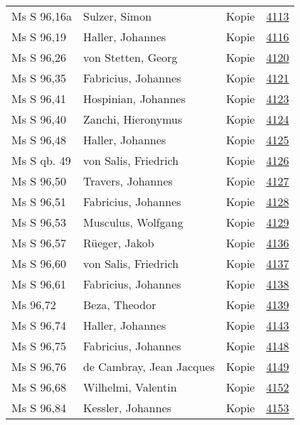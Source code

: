 \documentclass[10pt,a4paper,landscape]{report}
\begin{document}
\begin{longtable}{p{16cm}p{4cm}lr}
Ms S 96,16a	&	Sulzer, Simon	&	Kopie	&	\href{http://130.60.24.72/assignment/4113}{4113}\\
Ms S 96,19	&	Haller, Johannes	&	Kopie	&	\href{http://130.60.24.72/assignment/4116}{4116}\\
Ms S 96,26	&	von Stetten, Georg	&	Kopie	&	\href{http://130.60.24.72/assignment/4120}{4120}\\
Ms S 96,35	&	Fabricius, Johannes	&	Kopie	&	\href{http://130.60.24.72/assignment/4121}{4121}\\
Ms S 96,41	&	Hospinian, Johannes	&	Kopie	&	\href{http://130.60.24.72/assignment/4123}{4123}\\
Ms S 96,40	&	Zanchi, Hieronymus	&	Kopie	&	\href{http://130.60.24.72/assignment/4124}{4124}\\
Ms S 96,48	&	Haller, Johannes	&	Kopie	&	\href{http://130.60.24.72/assignment/4125}{4125}\\
Ms S qb. 49	&	von Salis, Friedrich	&	Kopie	&	\href{http://130.60.24.72/assignment/4126}{4126}\\
Ms S 96,50	&	Travers, Johannes	&	Kopie	&	\href{http://130.60.24.72/assignment/4127}{4127}\\
Ms S 96,51	&	Fabricius, Johannes	&	Kopie	&	\href{http://130.60.24.72/assignment/4128}{4128}\\
Ms S 96,53	&	Musculus, Wolfgang	&	Kopie	&	\href{http://130.60.24.72/assignment/4129}{4129}\\
Ms S 96,57	&	Rüeger, Jakob	&	Kopie	&	\href{http://130.60.24.72/assignment/4136}{4136}\\
Ms S 96,60	&	von Salis, Friedrich	&	Kopie	&	\href{http://130.60.24.72/assignment/4137}{4137}\\
Ms S 96,61	&	Fabricius, Johannes	&	Kopie	&	\href{http://130.60.24.72/assignment/4138}{4138}\\
Ms 96,72	&	Beza, Theodor	&	Kopie	&	\href{http://130.60.24.72/assignment/4139}{4139}\\
Ms S 96,74	&	Haller, Johannes	&	Kopie	&	\href{http://130.60.24.72/assignment/4143}{4143}\\
Ms S 96,75	&	Fabricius, Johannes	&	Kopie	&	\href{http://130.60.24.72/assignment/4148}{4148}\\
Ms S 96,76	&	de Cambray, Jean Jacques	&	Kopie	&	\href{http://130.60.24.72/assignment/4149}{4149}\\
Ms S 96,68	&	Wilhelmi, Valentin	&	Kopie	&	\href{http://130.60.24.72/assignment/4152}{4152}\\
Ms S 96,84	&	Kessler, Johannes	&	Kopie	&	\href{http://130.60.24.72/assignment/4153}{4153}\\

\end{longtable}
\end{document}
